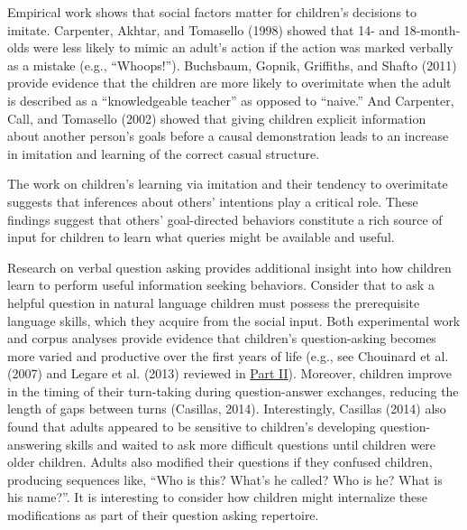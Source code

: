 \documentclass[english,floatsintext,man]{apa6}
\theoremstyle{definition}
\theoremstyle{definition}
\theoremstyle{definition}
\theoremstyle{remark}
\begin{document}
Empirical work shows that social factors matter for children's decisions
to imitate. Carpenter, Akhtar, and Tomasello (1998) showed that 14- and
18-month-olds were less likely to mimic an adult's action if the action
was marked verbally as a mistake (e.g., \enquote{Whoops!}). Buchsbaum,
Gopnik, Griffiths, and Shafto (2011) provide evidence that the children
are more likely to overimitate when the adult is described as a
\enquote{knowledgeable teacher} as opposed to \enquote{naive.} And
Carpenter, Call, and Tomasello (2002) showed that giving children
explicit information about another person's goals before a causal
demonstration leads to an increase in imitation and learning of the
correct casual structure.

The work on children's learning via imitation and their tendency to
overimitate suggests that inferences about others' intentions play a
critical role. These findings suggest that others' goal-directed
behaviors constitute a rich source of input for children to learn what
queries might be available and useful.

Research on verbal question asking provides additional insight into how
children learn to perform useful information seeking behaviors. Consider
that to ask a helpful question in natural language children must possess
the prerequisite language skills, which they acquire from the social
input. Both experimental work and corpus analyses provide evidence that
children's question-asking becomes more varied and productive over the
first years of life (e.g., see Chouinard et al. (2007) and Legare et al.
(2013) reviewed in \protect\hyperlink{p2}{Part II}). Moreover, children
improve in the timing of their turn-taking during question-answer
exchanges, reducing the length of gaps between turns (Casillas, 2014).
Interestingly, Casillas (2014) also found that adults appeared to be
sensitive to children's developing question-answering skills and waited
to ask more difficult questions until children were older children.
Adults also modified their questions if they confused children,
producing sequences like, \enquote{Who is this? What's he called? Who is
he? What is his name?}. It is interesting to consider how children might
internalize these modifications as part of their question asking
repertoire.
\end{document}
